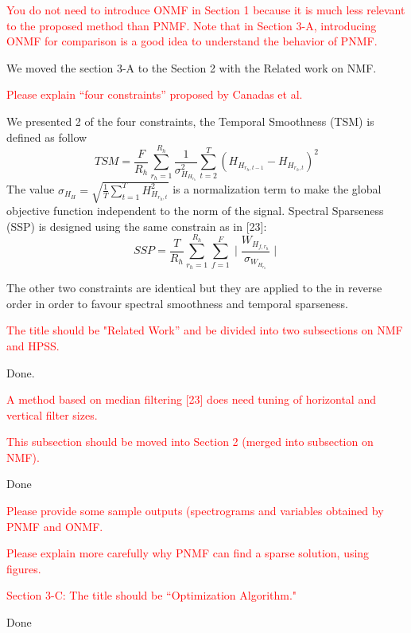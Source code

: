 \documentclass[]{article}
\begin{document}
\textcolor{red}{You do not need to introduce ONMF in Section 1 because it is much less relevant to the proposed method than PNMF. Note that in Section 3-A, introducing ONMF for comparison is a good idea to understand the behavior of PNMF.
}

We moved the section 3-A to the Section 2 with the Related work on NMF. 

\textcolor{red}{Please explain “four constraints” proposed by Canadas et al.
}

We presented 2 of the four constraints, the Temporal Smoothness (TSM) is defined as follow 
\begin{equation}\label{TSM}
TSM = \frac{F}{R_h} \sum_{r_h=1}^{R_h}\frac{1}{\sigma_{H_{H_{r_h}}}^2} \sum_{t=2}^{T}(H_{H_{r_h,t-1}} - H_{H_{r_h,t}})^2
\end{equation}
The value $\sigma_{H_{H}} = \sqrt{\frac{1}{T} \sum_{t=1}^{T} H_{H_{r_h,t}}^2 }$ is a normalization term to make the global objective function independent to the norm of the signal. Spectral Sparseness (SSP) is designed using the same constrain as in [23]:
\begin{equation}\label{SSP}
SSP = \frac{T}{R_h} \sum_{r_h=1}^{R_h}\sum_{f=1}^{F} \mid\frac{W_{H_{f,r_h}}}{\sigma_{W_{H_{r_h}}}}\mid
\end{equation}

The other two constraints are identical but they are applied to the in reverse order in order to favour spectral smoothness and temporal sparseness. 


\textcolor{red}{The title should be "Related Work” and be divided into two subsections on NMF and HPSS.
}

Done. 

\textcolor{red}{A method based on median filtering [23] does need tuning of horizontal and vertical filter sizes.
}

\textcolor{red}{This subsection should be moved into Section 2 (merged into subsection on NMF).
}

Done

\textcolor{red}{Please provide some sample outputs (spectrograms and variables  obtained by PNMF and ONMF.
}

\textcolor{red}{Please explain more carefully why PNMF can find a sparse solution, using figures.
}



\textcolor{red}{Section 3-C:
The title should be “Optimization Algorithm."
}

Done
\end{document}
